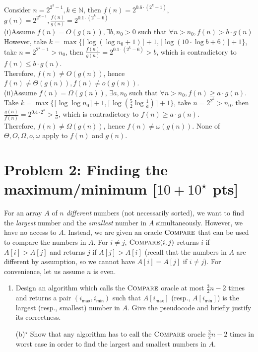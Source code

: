 \documentclass[11pt,twoside]{article}
\newcommand\N{\mbox{$\mathbb N$}}
\providecommand\ceil[1]{\lceil#1\rceil}
\newcommand{\problem}[1]{\section*{Problem #1}}
\newenvironment{solution}{{\par\noindent\it Solution.}}{}
\begin{document}
\begin{solution}
Consider $n=2^{2^k-1}, k\in \N$, then $f(n)=2^{0.6\cdot (2^k-1)}$, $g(n)=2^{2^{k-1}}, \frac{f(n)}{g(n)}=2^{0.1\cdot (2^k-6)}$
\vspace{0.3cm}\\
(i)Assume $f(n)=O(g(n)), \exists b, n_0>0$ such that $\forall n>n_0, f(n)>b\cdot g(n)$\\
However, take $k=\max\{\ceil{\log(\log n_0+1)}+1,\ceil{\log(10\cdot\log b+6)}+1\}$, take $n=2^{2^k-1}>n_0$,
then $\frac{f(n)}{g(n)}=2^{0.1\cdot(2^k-6)}>b$, which is contradictory to $f(n)\leq b\cdot g(n)$.\\
Therefore, $f(n)\neq O(g(n))$, hence $f(n)\neq \Theta(g(n)), f(n)\neq o(g(n))$.
\vspace{0.3cm}\\
(ii)Assume $f(n)=\Omega(g(n))$, $\exists a,n_0$ such that $\forall n>n_0,f(n)\geq a\cdot g(n)$.\\
Take $k=\max\{\ceil{\log\log n_0}+1,\ceil{\log(\frac{5}{2}\log \frac{1}{a})}+1\}$, take $n=2^{2^k}>n_0$, 
then $\frac{g(n)}{f(n)}=2^{0.4\cdot 2^k}>\frac{1}{a}$, which is contradictory to $f(n)\geq a\cdot g(n)$.\\
Therefore, $f(n)\neq \Omega(g(n))$, hence $f(n)\neq \omega(g(n))$. None of $\Theta, O, \Omega, o, \omega$ apply to $f(n)$ and $g(n)$.

 
\end{solution}

\problem{2: Finding the maximum/minimum [$10+10^\star$ pts]}
For an array $A$ of $n$ \textit{different} numbers (not necessarily sorted), we want to find the \textit{largest} number and the \textit{smallest} number in $A$ simultaneously.
However, we have no access to $A$.
Instead, we are given an oracle $\textsc{Compare}$ that can be used to compare the numbers in $A$.
For $i \neq j$, $\textsc{Compare}(i,j)$ returns $i$ if $A[i]>A[j]$ and returns $j$ if $A[j]>A[i]$ (recall that the numbers in $A$ are different by assumption, so we cannot have $A[i]=A[j]$ if $i \neq j$).
For convenience, let us assume $n$ is even.
\begin{enumerate}
    \item Design an algorithm which calls the $\textsc{Compare}$ oracle at most $\frac{3}{2} n - 2$ times and returns a pair $(i_\mathsf{max},i_\mathsf{min})$ such that $A[i_\mathsf{max}]$ (resp., $A[i_\mathsf{min}]$) is the largest (resp., smallest) number in $A$. Give the pseudocode and briefly justify its correctness.
    \item[(b)$^\star$] Show that any algorithm has to call the $\textsc{Compare}$ oracle $\frac{3}{2} n - 2$ times in worst case in order to find the largest and smallest numbers in $A$.
\end{enumerate}
\end{document}

